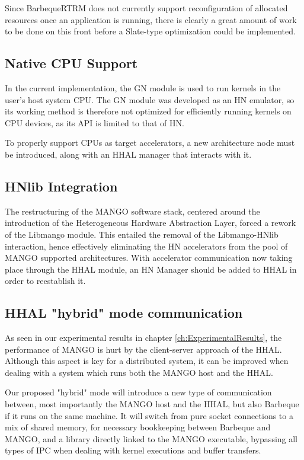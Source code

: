 Since BarbequeRTRM does not currently support reconfiguration of allocated resources once an application is running, there is clearly a great amount of work to be done on this front before a Slate-type optimization could be implemented.

\subsection{Native CPU Support}

In the current implementation, the GN module is used to run kernels in the user's host system CPU. The GN module was developed as an HN emulator, so its working method is therefore not optimized for efficiently running kernels on CPU devices, as its API is limited to that of HN.

To properly support CPUs as target accelerators, a new architecture node must be introduced, along with an HHAL manager that interacts with it.

\subsection{HNlib Integration}

The restructuring of the MANGO software stack, centered around the introduction of the Heterogeneous Hardware Abstraction Layer, forced a rework of the Libmango module. This entailed the removal of the Libmango-HNlib interaction, hence effectively eliminating the HN accelerators from the pool of MANGO supported architectures.
With accelerator communication now taking place through the HHAL module, an HN Manager should be added to HHAL in order to reestablish it.

\subsection{HHAL "hybrid" mode communication} \label{sub-sect:hhal-hybrid-mode}

As seen in our experimental results in chapter \ref{ch:ExperimentalResults}, the performance of MANGO is hurt by the client-server approach of the HHAL. Although this aspect is key for a distributed system, it can be improved when dealing with a system which runs both the MANGO host and the HHAL. 

Our proposed "hybrid" mode will introduce a new type of communication between, most importantly the MANGO host and the HHAL, but also Barbeque if it runs on the same machine. It will switch from pure socket connections to a mix of shared memory, for necessary bookkeeping between Barbeque and MANGO, and a library directly linked to the MANGO executable, bypassing all types of IPC when dealing with kernel executions and buffer transfers.

